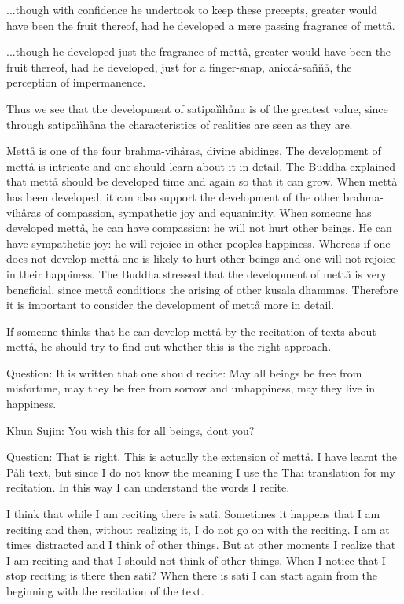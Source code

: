 \documentclass[12pt,twoside]{article}
\begin{document}
...though with confidence he undertook to keep these precepts, greater
would have been the fruit thereof, had he developed a mere passing
fragrance of mett{\aa}. 

...though he developed just the fragrance of mett{\aa}, greater would
have been the fruit thereof, had he developed, just for a
finger{}-snap, anicc{\aa}{}-sa\~n\~n{\aa}, the perception of
impermanence. 


\bigskip

Thus we see that the development of satipa\`i\`ih{\aa}na is of the
greatest value, since through satipa\`i\`ih{\aa}na the characteristics
of realities are seen as they are. 

Mett{\aa} is one of the four brahma{}-vih{\aa}ras, divine abidings. The
development of mett{\aa} is intricate and one should learn about it in
detail. The Buddha explained that mett{\aa} should be developed time
and again so that it can grow. When mett{\aa} has been developed, it
can also support the development of the other brahma{}-vih{\aa}ras of
compassion, sympathetic joy and equanimity. When someone has developed
mett{\aa}, he can have compassion: he will not hurt other beings. He
can have sympathetic joy: he will rejoice in other
people{\textquotesingle}s happiness. Whereas if one does not develop
mett{\aa} one is likely to hurt other beings and one will not rejoice
in their happiness. The Buddha stressed that the development of
mett{\aa} is very beneficial, since mett{\aa} conditions the arising of
other kusala dhammas. Therefore it is important to consider the
development of mett{\aa} more in detail. 

If someone thinks that he can develop mett{\aa} by the recitation of
texts about mett{\aa}, he should try to find out whether this is the
right approach. 

Question: It is written that one should recite:
{\textasciigrave}{\textasciigrave}May all beings be free from
misfortune, may they be free from sorrow and unhappiness, may they live
in happiness. {\textquotesingle}{\textquotesingle}

Khun Sujin: You wish this for all beings, don{\textquotesingle}t you?

Question: That is right. This is actually the extension of mett{\aa}. I
have learnt the P{\aa}li text, but since I do not know the meaning I
use the Thai translation for my recitation. In this way I can
understand the words I recite. 

I think that while I am reciting there is sati. Sometimes it happens
that I am reciting and then, without realizing it, I do not go on with
the reciting. I am at times distracted and I think of other things. But
at other moments I realize that I am reciting and that I should not
think of other things. When I notice that I stop reciting is there then
sati? When there is sati I can start again from the beginning with the
recitation of the text. 
\end{document}
